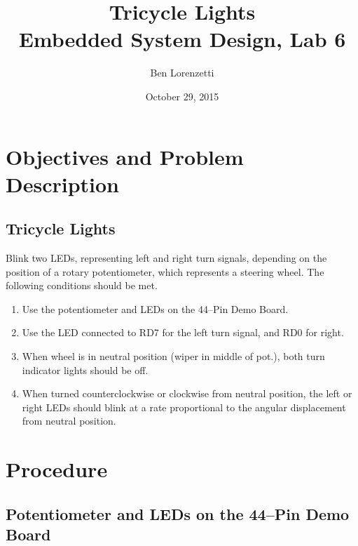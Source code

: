 \documentclass[11pt]{article}
\begin{document}
\title{Tricycle Lights\\Embedded System Design, Lab 6}
\date{October 29, 2015}
\author{Ben Lorenzetti}
\maketitle

\tableofcontents

\clearpage

\section{Objectives and Problem Description}
\label{problem-specs}

\subsection{Tricycle Lights}

Blink two LEDs, representing left and right turn signals,
depending on the position of a rotary potentiometer,
which represents a steering wheel. The following conditions should be met.

\begin{enumerate}
\item
Use the potentiometer and LEDs on the 44--Pin Demo Board.
\item
Use the LED connected to RD7 for the left turn signal, and RD0 for right.
\item
When wheel is in neutral position (wiper in middle of pot.),
both turn indicator lights should be off.
\item
When turned counterclockwise or clockwise from neutral position,
the left or right LEDs should blink at a rate proportional to the
angular displacement from neutral position.
\end{enumerate}

\section{Procedure}

\subsection{Potentiometer and LEDs on the 44--Pin Demo Board}
\end{document}
